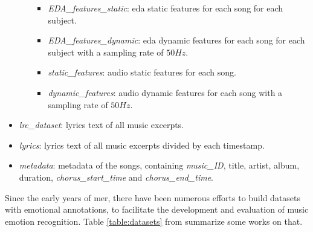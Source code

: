 \begin{itemize}
\begin{itemize}
\begin{itemize}
			\item \textit{EDA\_features\_static}: \gls{eda} static features for each song for each subject.
			\item \textit{EDA\_features\_dynamic}: \gls{eda} dynamic features for each song for each subject with a sampling rate of $50Hz$.
		\end{itemize}
		\begin{itemize}
			\item \textit{static\_features}: audio static features for each song.
			\item \textit{dynamic\_features}: audio dynamic features for each song with a sampling rate of $50Hz$.
		\end{itemize}
	\end{itemize}
	\item \textit{lrc\_dataset}: lyrics text of all music excerpts.
	\item \textit{lyrics}:  lyrics text of all music excerpts divided by each timestamp.
	\item \textit{metadata}: metadata of the songs, containing \textit{music\_ID}, title, artist, album, duration, \textit{chorus\_start\_time} and \textit{chorus\_end\_time}.
\end{itemize}
\newpage
Since the early years of \gls{mer}, there have been numerous efforts to build datasets with emotional annotations, to facilitate the development and evaluation of music emotion recognition. Table \ref{table:datasets} from \cite{zhang2018pmemo} summarize some works on that.
